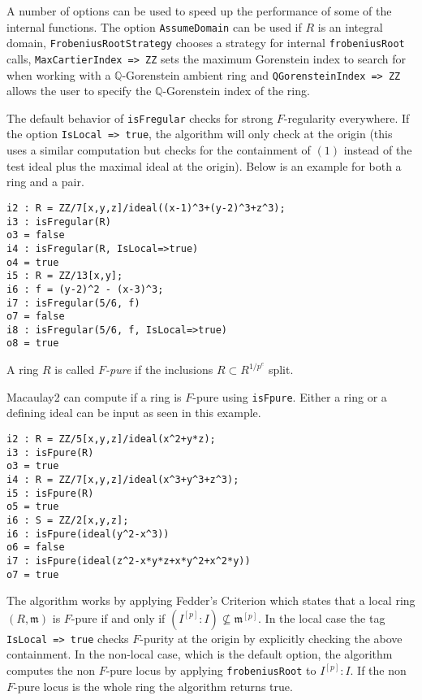 \documentclass[11pt]{amsart}
\begin{document}
A number of options can be used to speed up the performance of some of the
internal functions. The option {\tt AssumeDomain} can be used if $R$ is an
integral domain, {\tt FrobeniusRootStrategy} chooses a strategy for
internal {\tt frobeniusRoot} calls, {\tt MaxCartierIndex => ZZ} sets the
maximum Gorenstein index to search for when working with a
$\mathbb{Q}$-Gorenstein ambient ring and {\tt QGorensteinIndex => ZZ}
allows the user to specify the $\mathbb{Q}$-Gorenstein index of the ring.


The default behavior of {\tt isFregular} checks for strong $F$-regularity
everywhere. If the option {\tt IsLocal => true}, the algorithm will only
check at the origin (this uses a similar computation but checks for the
containment of $(1)$ instead of the test ideal plus the maximal ideal at
the origin). Below is an example for both a ring and a pair.


\begin{verbatim}
i2 : R = ZZ/7[x,y,z]/ideal((x-1)^3+(y-2)^3+z^3);
i3 : isFregular(R)
o3 = false
i4 : isFregular(R, IsLocal=>true)
o4 = true
i5 : R = ZZ/13[x,y];
i6 : f = (y-2)^2 - (x-3)^3;
i7 : isFregular(5/6, f)
o7 = false
i8 : isFregular(5/6, f, IsLocal=>true)
o8 = true
\end{verbatim}


\begin{definition}

A ring $R$ is called \emph{$F$-pure} if the inclusions $R \subset
R^{1/p^{e}}$ split.

\end{definition}


Macaulay2 can compute if a ring is $F$-pure using {\tt isFpure}. Either a
ring or a defining ideal can be input as seen in this example.


\begin{verbatim}
i2 : R = ZZ/5[x,y,z]/ideal(x^2+y*z);
i3 : isFpure(R)
o3 = true
i4 : R = ZZ/7[x,y,z]/ideal(x^3+y^3+z^3);
i5 : isFpure(R)
o5 = true
i6 : S = ZZ/2[x,y,z];
i6 : isFpure(ideal(y^2-x^3))
o6 = false
i7 : isFpure(ideal(z^2-x*y*z+x*y^2+x^2*y))
o7 = true
\end{verbatim}


The algorithm works by applying Fedder's Criterion which states that a
local ring $(R, \mathfrak{m})$ is $F$-pure if and only if $(I^{[p]} : I)
\not\subseteq \mathfrak{m}^{[p]}$. In the local case the tag {\tt IsLocal
=> true} checks $F$-purity at the origin by explicitly checking the above
containment. In the non-local case, which is the default option, the
algorithm computes the non $F$-pure locus by applying {\tt frobeniusRoot}
to $I^{[p]} :I$. If the non $F$-pure locus is the whole ring the algorithm
returns true.
\end{document}
